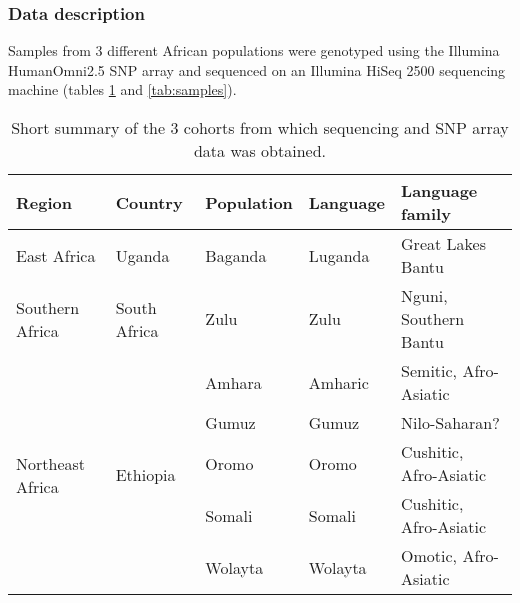 \subsubsection{Data description}
Samples from 3 different African populations were genotyped using the Illumina HumanOmni2.5 SNP array and sequenced on an Illumina HiSeq 2500 sequencing machine (tables \ref{tab:short_summary} and \ref{tab:samples}).

\begin{table}[ht]
\centering
\begin{tabular}{l|l|l|l|l}
Region & Country & Population & Language & Language family \\ \hline
East Africa & Uganda\cite{Asiki01022013} & Baganda & Luganda & Great Lakes Bantu \\ \hline
Southern Africa & South Africa & Zulu & Zulu & Nguni, Southern Bantu \\ \hline
\multirow{5}{*}{Northeast Africa} & \multirow{5}{*}{Ethiopia} & Amhara & Amharic & Semitic, Afro-Asiatic \\
& & Gumuz & Gumuz & Nilo-Saharan? \\
& & Oromo & Oromo & Cushitic, Afro-Asiatic \\
& & Somali & Somali & Cushitic, Afro-Asiatic \\
& & Wolayta & Wolayta & Omotic, Afro-Asiatic \\
\hline
\end{tabular}
\caption{Short summary of the 3 cohorts from which sequencing and SNP array data was obtained.}
\label{tab:short_summary}
\end{table}